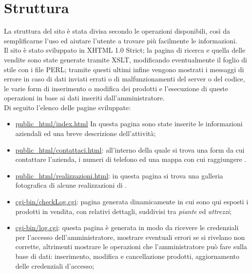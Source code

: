 \section{Struttura}{
	La struttura del sito è stata divisa secondo le operazioni disponibili, così da semplificarne l'uso ed aiutare l'utente a trovare più facilmente le informazioni.
	\\
	Il sito è stato sviluppato in XHTML 1.0 Strict; la pagina di ricerca e quella delle vendite sono state generate tramite XSLT, modificando eventualmente il foglio di stile con i file PERL; tramite questi ultimi infine vengono mostrati i messaggi di errore in caso di dati inviati errati o di malfunzionamenti del server o del codice, le varie form di inserimento o modifica dei prodotti e l'esecuzione di queste operazioni in base ai dati inseriti dall'amministratore.
	\\
	Di seguito l'elenco delle pagine sviluppate:
	\begin{itemize}\itemsep1pt
		\item \href{http://tecnologie-web.studenti.math.unipd.it/tecweb/~pgabelli/}{public\_html/index.html} In questa pagina sono state inserite le informazioni aziendali ed una breve descrizione dell'attività;
		\item \href{http://tecnologie-web.studenti.math.unipd.it/tecweb/~pgabelli/contattaci.html}{public\_html/contattaci.html}: all'interno della quale si trova una form da cui contattare l'azienda, i numeri di telefono ed una mappa con cui raggiungere \textbf{\ggt} .
		\item \href{http://tecnologie-web.studenti.math.unipd.it/tecweb/~pgabelli/realizzazioni.html}{public\_html/realizzazioni.html}: in questa pagina si trova una galleria fotografica di alcune realizzazioni di \textbf{\ggt}.
		\item \href{http://tecnologie-web.studenti.math.unipd.it/tecweb/~pgabelli/cgi-bin/checkLog.cgi}{cgi-bin/checkLog.cgi}: pagina generata dinamicamente in cui sono qui esposti i prodotti in vendita, con relativi dettagli, suddivisi tra \textit{piante} ed \textit{attrezzi};
		\item \href{http://tecnologie-web.studenti.math.unipd.it/tecweb/~pgabelli/cgi-bin/log.cgi}{cgi-bin/log.cgi}: questa pagina è generata in modo da ricevere le credenziali per l'accesso dell'amministratore, mostrare eventuali errori se si rivelano non corrette, altrimenti mostrare le operazioni che l'amministratore può fare sulla base di dati: inserimento, modifica e cancellazione prodotti, aggiornamento delle credenziali d'accesso;

\end{itemize}}
